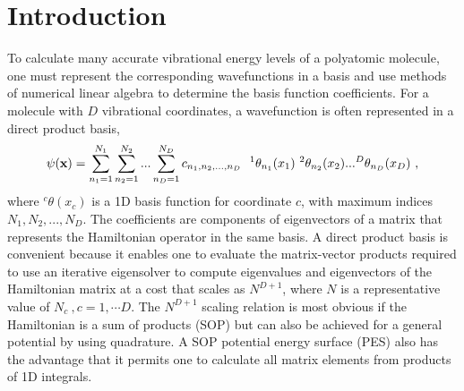   



\section{Introduction}\label{2sec1}



To calculate  many accurate vibrational energy levels of a  polyatomic molecule, one must represent the corresponding  wavefunctions 
 in a basis and use  methods of numerical  linear algebra to determine the basis function  coefficients.\cite{Carter1986,Tennyson1986,Bacic1989,Bowman2008}   
  For a molecule with $D$ vibrational coordinates,  a 
wavefunction is often represented in a  direct product basis,
\begin{equation}\label{Eq.dp}
\psi({\bf{x)}} = \sum_{n_1=1}^{N_1}\sum_{n_2=1}^{N_2}...\sum_{n_D=1}^{N_D}  c_{n_1,n_2,...,n_D} ~~  ^1\theta_{n_1}(x_1)~  ^2\theta_{n_2}(x_2)...^D\theta_{n_D}(x_D) ~,
\end{equation}
%
where $^c\theta(x_c )$ is a  1D basis function for coordinate $c$,
  with maximum  indices $N_1,N_2,...,N_D$.  
The coefficients are components of eigenvectors of a matrix that represents the Hamiltonian operator in the same basis.  
A direct product basis is convenient because it enables one to  evaluate  the matrix-vector products required to use an 
iterative eigensolver to compute eigenvalues and eigenvectors of the Hamiltonian matrix at a cost that scales as $N^{D+1}$, where $N$ is a representative value of $N_c~,c=1, \cdots D$.\cite{Light2000,Manthe1990,Bramley1993,Bramley1994} 
 The   $N^{D+1}$ scaling relation is most obvious if the Hamiltonian is a sum of products (SOP) but can also be achieved for a general potential by using quadrature.\cite{Light2000} 
%
  A SOP potential energy surface
(PES) also has the advantage that it 
permits one to calculate all matrix elements from  products of 1D integrals.\cite{Jelski1996}  


%




